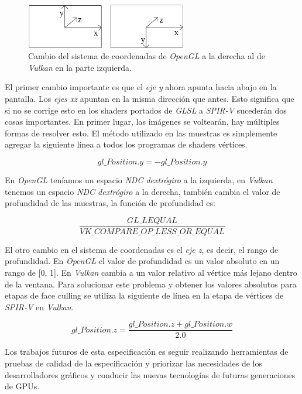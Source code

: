 \documentclass[a4paper]{book}
\begin{document}
\begin{figure}[H]
    \centering
    \includegraphics[width=7cm, keepaspectratio]{img/coordinateDiagram.png}
    \caption{Cambio del sistema de coordenadas de \textit{OpenGL} a la derecha al de \textit{Vulkan} en la parte izquierda.}
    \label{coordinateDiagram}
\end{figure}

El primer cambio importante es que el \textit{eje y} ahora apunta hacia abajo en la pantalla. Los \textit{ejes xz} apuntan en la misma
dirección que antes. Esto significa que si no se corrige esto en los shaders portados de \textit{GLSL} a \textit{SPIR-V} sucederán dos
cosas importantes. En primer lugar, las imágenes se voltearán, hay múltiples formas de resolver esto. El método
utilizado en las muestras es simplemente agregar la siguiente línea a todos los programas de shaders vértices.

\begin{equation} gl\_Position.y = -gl\_Position.y \end{equation}

En \textit{OpenGL} teníamos un espacio \textit{NDC dextrógiro} a la izquierda, en \textit{Vulkan} tenemos un espacio \textit{NDC dextrógiro}
a la derecha, también cambia el valor de profundidad de las muestras, la función de profundidad es:

\begin{equation} \frac{GL\_LEQUAL}  {VK\_COMPARE\_OP\_LESS\_OR\_EQUAL} \end{equation}

El otro cambio en el sistema de coordenadas es el \textit{eje z}, es decir, el rango de profundidad. En \textit{OpenGL} el valor de profundidad
es un valor absoluto en un rango de [0, 1]. En \textit{Vulkan} cambia a un valor relativo al vértice más lejano dentro de la ventana.
Para solucionar este problema y obtener los valores absolutos para etapas de face culling se utiliza la siguiente de línea
en la etapa de vértices de \textit{SPIR-V} en \textit{Vulkan}.

\begin{equation} gl\_Position.z = \frac{gl\_Position.z + gl\_Position.w} {2.0} \end{equation}

Los trabajos futuros de esta especificación es seguir realizando herramientas de pruebas de calidad de la especificación
y priorizar las necesidades de los desarrolladores gráficos y conducir las nuevas tecnologías de futuras generaciones de GPUs. \cite{vulkan:_system}
\end{document}
